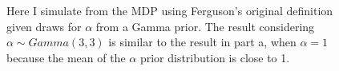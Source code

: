 \documentclass[a4paper, 10pt]{article}
\begin{document}
\begin{enumerate}
\begin{enumerate}
\begin{figure}[h!]
            \caption{Here I simulate from the MDP using Ferguson's original definition given draws for $\alpha$ from a Gamma prior. The result considering $\alpha \sim Gamma(3,3)$ is similar to the result in part a, when $\alpha = 1$ because the mean of the $\alpha$ prior distribution is close to 1.}
            \label{c1}
        \end{figure}
        

\end{enumerate}
\end{enumerate}
\end{document}
